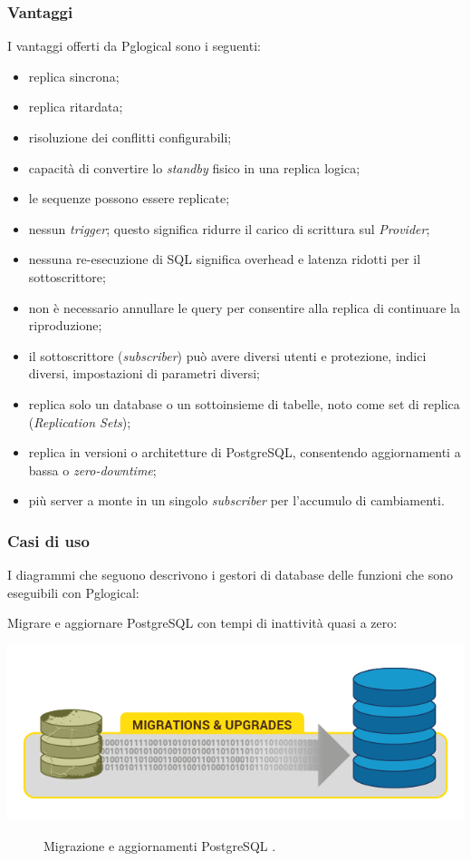 \subsubsection{Vantaggi}
I vantaggi offerti da Pglogical sono i seguenti:
\begin{itemize}
\item
replica sincrona;
\item
replica ritardata;
\item
risoluzione dei conflitti configurabili;
\item
capacit\`{a} di convertire lo \textit{standby} fisico in una replica logica;
\item
le sequenze possono essere replicate;
\item
nessun \textit{trigger}; questo significa ridurre il carico di scrittura sul \textit{Provider};
\item
nessuna re-esecuzione di SQL significa overhead e latenza ridotti per il sottoscrittore;
\item
non \`{e} necessario annullare le query per consentire alla replica di continuare la riproduzione;
\item
il sottoscrittore (\textit{subscriber}) pu\`{o} avere diversi utenti e protezione, indici diversi, impostazioni di parametri diversi;
\item
replica solo un database o un sottoinsieme di tabelle, noto come set di replica (\textit{Replication Sets});
\item
replica in versioni o architetture di PostgreSQL, consentendo aggiornamenti a bassa o \textit{zero-downtime};
\item
pi\`{u} server a monte in un singolo \textit{subscriber} per l'accumulo di cambiamenti\cite{etichetta3}.
\end{itemize}

\subsubsection{Casi di uso}
I diagrammi che seguono descrivono i gestori di database delle funzioni che sono eseguibili con Pglogical:

Migrare e aggiornare PostgreSQL con tempi di inattivit\`{a} quasi a zero: 

\begin{center}
\includegraphics[scale=0.60]{img/pglogical_1.png}\\
\end{center}
\begin{figure}[htbp]
\caption{Migrazione e aggiornamenti PostgreSQL \cite{etichetta3}.}
\label{fig:pglogical_1}
\end{figure}


